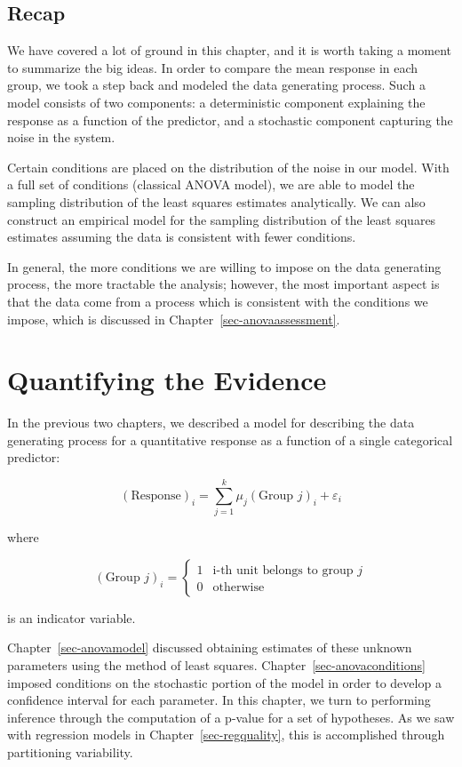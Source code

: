 \documentclass[
  letterpaper,
  DIV=11,
  numbers=noendperiod]{scrreprt}
\theoremstyle{plain}
\theoremstyle{definition}
\theoremstyle{definition}
\theoremstyle{remark}
\begin{document}
\section{Recap}\label{recap-1}

We have covered a lot of ground in this chapter, and it is worth taking
a moment to summarize the big ideas. In order to compare the mean
response in each group, we took a step back and modeled the data
generating process. Such a model consists of two components: a
deterministic component explaining the response as a function of the
predictor, and a stochastic component capturing the noise in the system.

Certain conditions are placed on the distribution of the noise in our
model. With a full set of conditions (classical ANOVA model), we are
able to model the sampling distribution of the least squares estimates
analytically. We can also construct an empirical model for the sampling
distribution of the least squares estimates assuming the data is
consistent with fewer conditions.

In general, the more conditions we are willing to impose on the data
generating process, the more tractable the analysis; however, the most
important aspect is that the data come from a process which is
consistent with the conditions we impose, which is discussed in
Chapter~\ref{sec-anovaassessment}.

\chapter{Quantifying the Evidence}\label{sec-anovateststat}

In the previous two chapters, we described a model for describing the
data generating process for a quantitative response as a function of a
single categorical predictor:

\[(\text{Response})_i = \sum_{j = 1}^{k} \mu_j (\text{Group } j)_i + \varepsilon_i\]

where

\[(\text{Group } j)_i = \begin{cases} 1 & \text{i-th unit belongs to group } j \\ 0 & \text{otherwise} \end{cases}\]

is an indicator variable.

Chapter~\ref{sec-anovamodel} discussed obtaining estimates of these
unknown parameters using the method of least squares.
Chapter~\ref{sec-anovaconditions} imposed conditions on the stochastic
portion of the model in order to develop a confidence interval for each
parameter. In this chapter, we turn to performing inference through the
computation of a p-value for a set of hypotheses. As we saw with
regression models in Chapter~\ref{sec-regquality}, this is accomplished
through partitioning variability.
\end{document}
